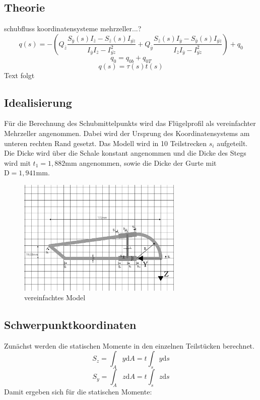 
\subsection{Theorie}
schubfluss
koordinatensysteme
mehrzeller...?
\begin{equation}\label{qs}
	q(s)=-(Q_{\bar{z}}\frac{S_{\bar{y}}(s)I_{\bar{z}}-S_{\bar{z}}(s)I_{\bar{yz}}}{I_{\bar{y}}I_{\bar{z}}-I_{\bar{yz}}^2}+Q_{\bar{y}}\frac{S_{\bar{z}}(s)I_{\bar{y}}-S_{\bar{y}}(s)I_{\bar{yz}}}{I_{\bar{z}}I_{\bar{y}}-I_{\bar{yz}}^2})+q_0
\end{equation}
\begin{equation}
	q_{0} = q_{0b}+q_{0T}
\end{equation}
\begin{equation}\label{tau}
	q(s)=\tau(s)t(s)
\end{equation}
Text folgt
\subsection{Idealisierung}
Für die Berechnung des Schubmittelpunkts wird das Flügelprofil als vereinfachter Mehrzeller angenommen.
Dabei wird der Ursprung des Koordinatensystems am unteren rechten Rand gesetzt. Das Modell wird in 10 Teilstrecken $s_{i}$ aufgeteilt. Die Dicke wird über die Schale konstant angenommen und die Dicke des Stegs wird mit $t_{1}=1,882\mathrm{mm}$ angenommen, sowie die Dicke der Gurte mit $\mathrm{D}=1,941\mathrm{mm}$.
\begin{figure}[h]
 \centering
 \includegraphics[width=0.7\textwidth]{Bilder/Model1}
 \caption{vereinfachtes Model}
 \label{fig:Model1}
\end{figure}
\subsection{Schwerpunktkoordinaten}\label{SP-Koord}
Zunächst werden die statischen Momente in den einzelnen Teilstücken berechnet.
\begin{equation}
	S_{z}=\int_{A}^{}y \mathrm{d}A =t\int_{s}^{}y \mathrm{d}s
\end{equation}
\begin{equation}
	S_{y}=\int_{A}^{}z \mathrm{d}A =t\int_{s}^{}z \mathrm{d}s 
\end{equation}
Damit ergeben sich für die statischen Momente:


